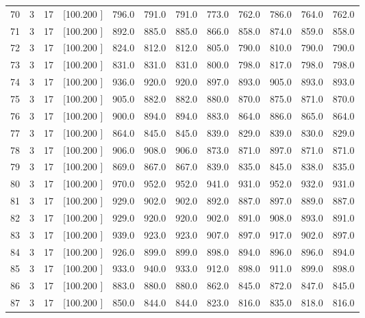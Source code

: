 \documentclass[12pt,a4paper]{article}
\begin{document}
\begin{center}
{\begin{tabular}{r r r r r r r r r r r r}
  70&  3& 17&[100.200   ]&   796.0&   791.0&   791.0&   773.0&   762.0&   786.0&   764.0&   762.0\\[-0.02in]
  71&  3& 17&[100.200   ]&   892.0&   885.0&   885.0&   866.0&   858.0&   874.0&   859.0&   858.0\\[-0.02in]
  72&  3& 17&[100.200   ]&   824.0&   812.0&   812.0&   805.0&   790.0&   810.0&   790.0&   790.0\\[-0.02in]
  73&  3& 17&[100.200   ]&   831.0&   831.0&   831.0&   800.0&   798.0&   817.0&   798.0&   798.0\\[-0.02in]
  74&  3& 17&[100.200   ]&   936.0&   920.0&   920.0&   897.0&   893.0&   905.0&   893.0&   893.0\\[-0.02in]
  75&  3& 17&[100.200   ]&   905.0&   882.0&   882.0&   880.0&   870.0&   875.0&   871.0&   870.0\\[-0.02in]
  76&  3& 17&[100.200   ]&   900.0&   894.0&   894.0&   883.0&   864.0&   886.0&   865.0&   864.0\\[-0.02in]
  77&  3& 17&[100.200   ]&   864.0&   845.0&   845.0&   839.0&   829.0&   839.0&   830.0&   829.0\\[-0.02in]
  78&  3& 17&[100.200   ]&   906.0&   908.0&   906.0&   873.0&   871.0&   897.0&   871.0&   871.0\\[-0.02in]
  79&  3& 17&[100.200   ]&   869.0&   867.0&   867.0&   839.0&   835.0&   845.0&   838.0&   835.0\\[-0.02in]
  80&  3& 17&[100.200   ]&   970.0&   952.0&   952.0&   941.0&   931.0&   952.0&   932.0&   931.0\\[-0.02in]
  81&  3& 17&[100.200   ]&   929.0&   902.0&   902.0&   892.0&   887.0&   897.0&   889.0&   887.0\\[-0.02in]
  82&  3& 17&[100.200   ]&   929.0&   920.0&   920.0&   902.0&   891.0&   908.0&   893.0&   891.0\\[-0.02in]
  83&  3& 17&[100.200   ]&   939.0&   923.0&   923.0&   907.0&   897.0&   917.0&   902.0&   897.0\\[-0.02in]
  84&  3& 17&[100.200   ]&   926.0&   899.0&   899.0&   898.0&   894.0&   896.0&   896.0&   894.0\\[-0.02in]
  85&  3& 17&[100.200   ]&   933.0&   940.0&   933.0&   912.0&   898.0&   911.0&   899.0&   898.0\\[-0.02in]
  86&  3& 17&[100.200   ]&   883.0&   880.0&   880.0&   862.0&   845.0&   872.0&   847.0&   845.0\\[-0.02in]
  87&  3& 17&[100.200   ]&   850.0&   844.0&   844.0&   823.0&   816.0&   835.0&   818.0&   816.0\\[-0.02in]

\end{tabular}}
\end{center}
\end{document}
